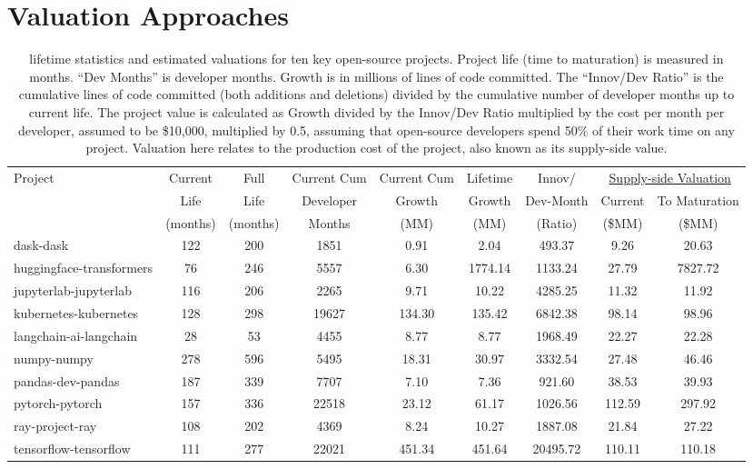 \documentclass[conference]{IEEEtran}
\begin{document}
\section{Valuation Approaches}
\label{sec:valuation}


\begin{table}
\centering
\caption{\label{tab:valuation} \small lifetime statistics and estimated valuations for ten key open-source projects. Project life (time to maturation) is measured in months. ``Dev Months'' is developer months. Growth is in millions of lines of code committed. The ``Innov/Dev Ratio'' is the cumulative lines of code committed (both additions and deletions) divided by the cumulative number of developer months up to current life. The project value is calculated as Growth divided by the Innov/Dev Ratio multiplied by the cost per month per developer, assumed to be \$10,000, multiplied by 0.5, assuming that open-source developers spend 50\% of their work time on any project. Valuation here relates to the production cost of the project, also known as its supply-side value. 
}
\begin{tabular}{lcccccccc}
\toprule
Project & Current & Full  & Current Cum & Current Cum & Lifetime & Innov/ & \multicolumn{2}{c}{\underline{Supply-side Valuation}} \\
 & Life  & Life  & Developer & Growth  & Growth  & Dev-Month & Current  & To Maturation  \\
 & (months) & (months) & Months & (MM) & (MM) & (Ratio) & (\$MM) & (\$MM) \\
\midrule
dask-dask & 122 & 200 & 1851 & 0.91 & 2.04 & 493.37 & 9.26 & 20.63 \\
huggingface-transformers & 76 & 246 & 5557 & 6.30 & 1774.14 & 1133.24 & 27.79 & 7827.72 \\
jupyterlab-jupyterlab & 116 & 206 & 2265 & 9.71 & 10.22 & 4285.25 & 11.32 & 11.92 \\
kubernetes-kubernetes & 128 & 298 & 19627 & 134.30 & 135.42 & 6842.38 & 98.14 & 98.96 \\
langchain-ai-langchain & 28 & 53 & 4455 & 8.77 & 8.77 & 1968.49 & 22.27 & 22.28 \\
numpy-numpy & 278 & 596 & 5495 & 18.31 & 30.97 & 3332.54 & 27.48 & 46.46 \\
pandas-dev-pandas & 187 & 339 & 7707 & 7.10 & 7.36 & 921.60 & 38.53 & 39.93 \\
pytorch-pytorch & 157 & 336 & 22518 & 23.12 & 61.17 & 1026.56 & 112.59 & 297.92 \\
ray-project-ray & 108 & 202 & 4369 & 8.24 & 10.27 & 1887.08 & 21.84 & 27.22 \\
tensorflow-tensorflow & 111 & 277 & 22021 & 451.34 & 451.64 & 20495.72 & 110.11 & 110.18 \\
\bottomrule
\end{tabular}
\end{table}
\end{document}
